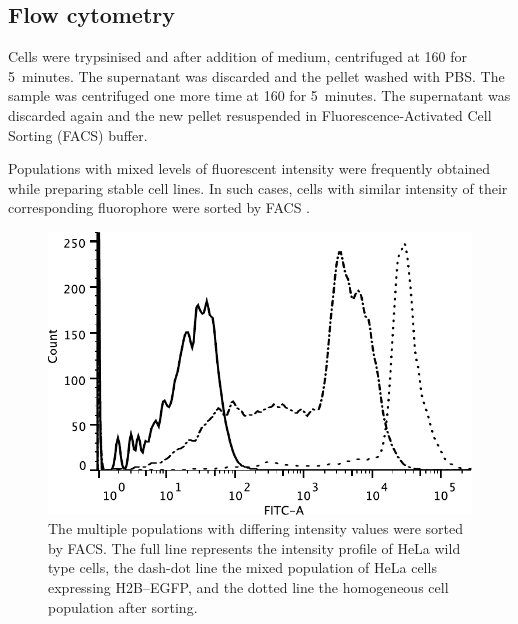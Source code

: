     \subsection{Flow cytometry}

      Cells were trypsinised and after addition of medium, centrifuged
      at \SI{160}{\gn} for 5~minutes. The supernatant was discarded and the
      pellet washed with PBS. The sample was centrifuged one more time at
      \SI{160}{\gn} for 5~minutes. The supernatant was discarded again
      and the new
      pellet resuspended in Fluorescence-Activated Cell Sorting (FACS) buffer.

      Populations with mixed levels of fluorescent intensity were
      frequently obtained while preparing stable cell lines. In such
      cases, cells with similar intensity of their corresponding
      fluorophore were sorted by FACS .

      \begin{figure}
        \centering
        \includegraphics[width=\textwidth]{figs/facs-stable-cell-lines.pdf}
                     { The multiple populations with differing
                       intensity values were sorted by FACS. The full
                       line represents the intensity profile of HeLa
                       wild type cells, the dash-dot line the mixed
                       population of HeLa cells expressing H2B--EGFP,
                       and the dotted line the homogeneous cell
                       population after sorting.  }
        \label{fig:methods:facs}
      \end{figure}

